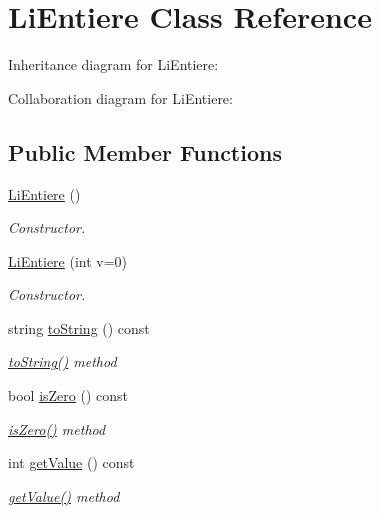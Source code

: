 \hypertarget{class_li_entiere}{}\section{Li\+Entiere Class Reference}
\label{class_li_entiere}


Inheritance diagram for Li\+Entiere\+:


Collaboration diagram for Li\+Entiere\+:
\subsection*{Public Member Functions}
\begin{DoxyCompactItemize}
\item 
\hyperlink{class_li_entiere_ac49b914ca5fc86f212095bc750375959}{Li\+Entiere} ()
\begin{DoxyCompactList}\small\item\em Constructor. \end{DoxyCompactList}\item 
\hyperlink{class_li_entiere_a5bef763146703f9a49b723715a39973b}{Li\+Entiere} (int v=0)
\begin{DoxyCompactList}\small\item\em Constructor. \end{DoxyCompactList}\item 
string \hyperlink{class_li_entiere_a48fceee2e4f1d481b923ebb28a085baf}{to\+String} () const 
\begin{DoxyCompactList}\small\item\em \hyperlink{class_li_entiere_a48fceee2e4f1d481b923ebb28a085baf}{to\+String()} method \end{DoxyCompactList}\item 
bool \hyperlink{class_li_entiere_a21645454b355997a8a73156900546cbd}{is\+Zero} () const 
\begin{DoxyCompactList}\small\item\em \hyperlink{class_li_entiere_a21645454b355997a8a73156900546cbd}{is\+Zero()} method \end{DoxyCompactList}\item 
int \hyperlink{class_li_entiere_a83bbae276cdb1946b18d913f99bab0e7}{get\+Value} () const 
\begin{DoxyCompactList}\small\item\em \hyperlink{class_li_entiere_a83bbae276cdb1946b18d913f99bab0e7}{get\+Value()} method \end{DoxyCompactList}\item 

\end{DoxyCompactItemize}
